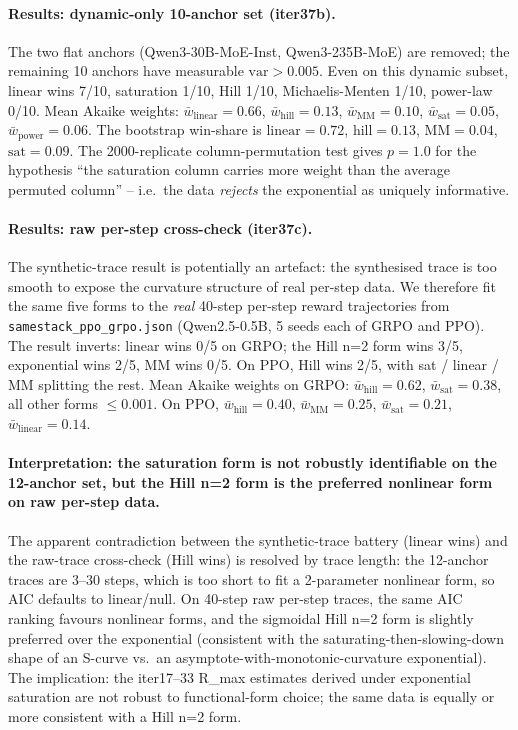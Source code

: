 \documentclass{article}
\begin{document}
\paragraph{Results: dynamic-only 10-anchor set (iter37b).}
The two flat anchors (Qwen3-30B-MoE-Inst, Qwen3-235B-MoE) are removed;
the remaining 10 anchors have measurable $\mathrm{var}>0.005$. Even
on this dynamic subset, linear wins 7/10, saturation 1/10, Hill 1/10,
Michaelis-Menten 1/10, power-law 0/10. Mean Akaike weights:
$\bar{w}_{\mathrm{linear}}=0.66$, $\bar{w}_{\mathrm{hill}}=0.13$,
$\bar{w}_{\mathrm{MM}}=0.10$, $\bar{w}_{\mathrm{sat}}=0.05$,
$\bar{w}_{\mathrm{power}}=0.06$. The bootstrap win-share is
$\mathrm{linear}=0.72$, $\mathrm{hill}=0.13$, $\mathrm{MM}=0.04$,
$\mathrm{sat}=0.09$. The 2000-replicate column-permutation test gives
$p=1.0$ for the hypothesis ``the saturation column carries more
weight than the average permuted column'' -- i.e.\ the data
\emph{rejects} the exponential as uniquely informative.

\paragraph{Results: raw per-step cross-check (iter37c).}
The synthetic-trace result is potentially an artefact: the
synthesised trace is too smooth to expose the curvature structure
of real per-step data. We therefore fit the same five forms to the
\emph{real} 40-step per-step reward trajectories from
\texttt{samestack\_ppo\_grpo.json} (Qwen2.5-0.5B, 5 seeds each of
GRPO and PPO). The result inverts: linear wins 0/5 on GRPO; the
Hill n=2 form wins 3/5, exponential wins 2/5, MM wins 0/5. On PPO,
Hill wins 2/5, with sat / linear / MM splitting the rest. Mean
Akaike weights on GRPO: $\bar{w}_{\mathrm{hill}}=0.62$,
$\bar{w}_{\mathrm{sat}}=0.38$, all other forms $\le 0.001$. On PPO,
$\bar{w}_{\mathrm{hill}}=0.40$, $\bar{w}_{\mathrm{MM}}=0.25$,
$\bar{w}_{\mathrm{sat}}=0.21$, $\bar{w}_{\mathrm{linear}}=0.14$.

\paragraph{Interpretation: the saturation form is not robustly
identifiable on the 12-anchor set, but the Hill n=2 form is the
preferred nonlinear form on raw per-step data.}
The apparent contradiction between the synthetic-trace battery
(linear wins) and the raw-trace cross-check (Hill wins) is resolved
by trace length: the 12-anchor traces are 3--30 steps, which is too
short to fit a 2-parameter nonlinear form, so AIC defaults to
linear/null. On 40-step raw per-step traces, the same AIC ranking
favours nonlinear forms, and the sigmoidal Hill n=2 form is
slightly preferred over the exponential (consistent with the
saturating-then-slowing-down shape of an S-curve vs.\ an
asymptote-with-monotonic-curvature exponential). The
implication: the iter17--33 R_max estimates derived under
exponential saturation are not robust to functional-form choice;
the same data is equally or more consistent with a Hill
n=2 form.
\end{document}

